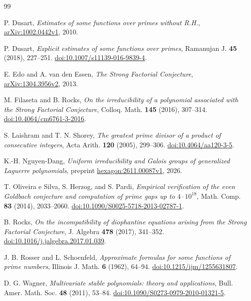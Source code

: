 \begin{thebibliography}{99}

P. Dusart,
\emph{Estimates of some functions over primes without R.H.},
\href{https://arxiv.org/abs/1002.0442v1}{arXiv:1002.0442v1}, 2010.

P. Dusart,
\emph{Explicit estimates of some functions over primes},
Ramanujan J. \textbf{45} (2018), 227--251.
\href{https://doi.org/10.1007/s11139-016-9839-4}{doi:10.1007/s11139-016-9839-4}.

E. Edo and A. van den Essen,
\emph{The Strong Factorial Conjecture},
\href{https://arxiv.org/abs/1304.3956v2}{arXiv:1304.3956v2}, 2013.

M. Filaseta and B. Rocks,
\emph{On the irreducibility of a polynomial associated with the Strong Factorial Conjecture},
Colloq. Math. \textbf{145} (2016), 307--314.
\href{https://doi.org/10.4064/cm6761-3-2016}{doi:10.4064/cm6761-3-2016}.

S. Laishram and T. N. Shorey,
\emph{The greatest prime divisor of a product of consecutive integers},
Acta Arith. \textbf{120} (2005), 299--306.
\href{https://doi.org/10.4064/aa120-3-5}{doi:10.4064/aa120-3-5}.

K.-H. Nguyen-Dang,
\emph{Uniform irreducibility and Galois groups of generalized Laguerre polynomials},
preprint \href{https://hexagonmath.org/pdf/2611.00087v1}{hexagon:2611.00087v1},
2026.

T. Oliveira e Silva, S. Herzog, and S. Pardi,
\emph{Empirical verification of the even Goldbach conjecture and computation
of prime gaps up to \(4\cdot10^{18}\)},
Math. Comp. \textbf{83} (2014), 2033--2060.
\href{https://doi.org/10.1090/S0025-5718-2013-02787-1}{doi:10.1090/S0025-5718-2013-02787-1}.

B. Rocks,
\emph{On the incompatibility of diophantine equations arising from the
Strong Factorial Conjecture},
J. Algebra \textbf{478} (2017), 341--352.
\href{https://doi.org/10.1016/j.jalgebra.2017.01.039}{doi:10.1016/j.jalgebra.2017.01.039}.

J. B. Rosser and L. Schoenfeld,
\emph{Approximate formulas for some functions of prime numbers},
Illinois J. Math. \textbf{6} (1962), 64--94.
\href{https://doi.org/10.1215/ijm/1255631807}{doi:10.1215/ijm/1255631807}.

D. G. Wagner,
\emph{Multivariate stable polynomials: theory and applications},
Bull. Amer. Math. Soc. \textbf{48} (2011), 53--84.
\href{https://doi.org/10.1090/S0273-0979-2010-01321-5}{doi:10.1090/S0273-0979-2010-01321-5}.

\end{thebibliography}

